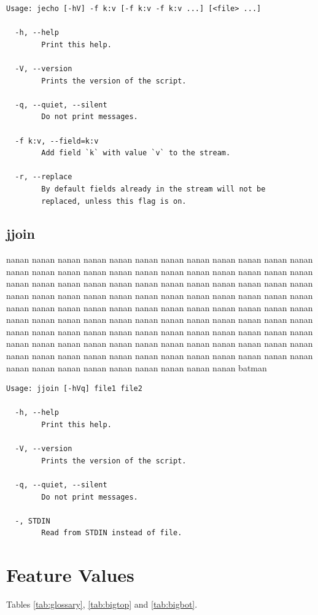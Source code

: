 \documentclass[11pt,a4paper,draft]{report}
\begin{document}
{\small
\begin{Verbatim}[samepage=true]
Usage: jecho [-hV] -f k:v [-f k:v -f k:v ...] [<file> ...]

  -h, --help
        Print this help.

  -V, --version
        Prints the version of the script.

  -q, --quiet, --silent
        Do not print messages.

  -f k:v, --field=k:v
        Add field `k` with value `v` to the stream.

  -r, --replace
        By default fields already in the stream will not be
        replaced, unless this flag is on.
\end{Verbatim}
}

\section{jjoin}

nanan nanan nanan nanan nanan nanan nanan nanan nanan nanan nanan nanan nanan
nanan nanan nanan nanan nanan nanan nanan nanan nanan nanan nanan nanan nanan
nanan nanan nanan nanan nanan nanan nanan nanan nanan nanan nanan nanan nanan
nanan nanan nanan nanan nanan nanan nanan nanan nanan nanan nanan nanan nanan
nanan nanan nanan nanan nanan nanan nanan nanan nanan nanan nanan nanan nanan
nanan nanan nanan nanan nanan nanan nanan nanan nanan nanan nanan nanan nanan
nanan nanan nanan nanan nanan nanan nanan nanan nanan nanan nanan nanan nanan
nanan nanan nanan nanan nanan nanan nanan nanan nanan nanan nanan nanan nanan
nanan nanan nanan nanan nanan nanan nanan nanan nanan nanan nanan nanan nanan
batman

{\small
\begin{Verbatim}[samepage=true]
Usage: jjoin [-hVq] file1 file2

  -h, --help
        Print this help.

  -V, --version
        Prints the version of the script.

  -q, --quiet, --silent
        Do not print messages.

  -, STDIN
        Read from STDIN instead of file.
\end{Verbatim}
}

\chapter{Feature Values}
\label{chap:glossary}

Tables \ref{tab:glossary}, \ref{tab:bigtop} and \ref{tab:bigbot}.
\end{document}
